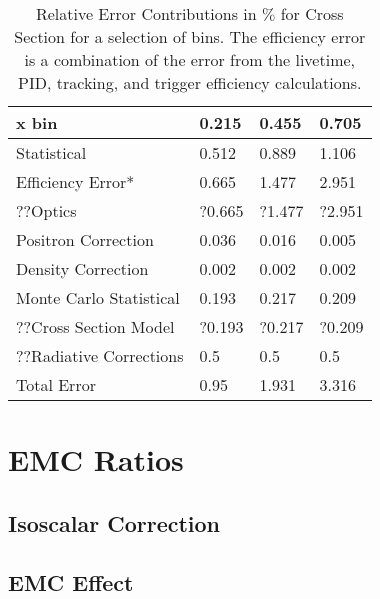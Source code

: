 \begin{table}[]
	\caption{Relative Error Contributions in $\%$ for Cross Section for a selection of bins. The efficiency error is a combination of the error from the livetime, PID, tracking, and trigger efficiency calculations.}
	\centering
	\begin{tabular}{|l|l|l|l|}
		\hline
		\textbf{\qquad \qquad\qquad x bin}   & \textbf{0.215} & \textbf{0.455} & \textbf{0.705} \\ \hline\hline
		Statistical             & 0.512 & 0.889 & 1.106 \\ \hline
		Efficiency Error*       & 0.665 & 1.477 & 2.951 \\ \hline
		??Optics 				& ?0.665& ?1.477 &?2.951 \\ \hline
		Positron Correction     & 0.036 & 0.016 & 0.005 \\ \hline
		Density Correction      & 0.002 & 0.002 & 0.002 \\ \hline
		Monte Carlo Statistical & 0.193 & 0.217 & 0.209 \\ \hline
		??Cross Section Model 	& ?0.193 & ?0.217 & ?0.209 \\ \hline
		??Radiative Corrections\cite{primer} 	& 0.5  & 0.5 & 0.5 \\ \hline
		Total Error		 	 	& 0.95  & 1.931 & 3.316 \\ \hline
	\end{tabular}
\end{table}
\cite{Ar_Ti}


\section{EMC Ratios}

\subsection{Isoscalar Correction}
\subsection{EMC Effect}

